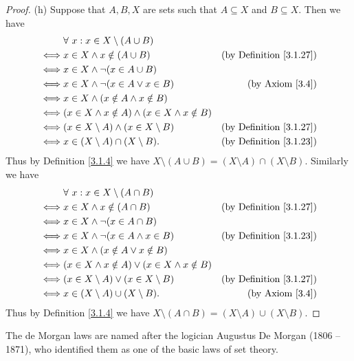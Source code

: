 \begin{proof}{(h)}
Suppose that \(A, B, X\) are sets such that \(A \subseteq X\) and \(B \subseteq X\).
Then we have
\begin{align*}
& \forall\ x : x \in X \setminus (A \cup B) \\
\iff & x \in X \land x \notin (A \cup B) & \text{(by Definition \ref{3.1.27})} \\
\iff & x \in X \land \lnot (x \in A \cup B) \\
\iff & x \in X \land \lnot (x \in A \lor x \in B) & \text{(by Axiom \ref{3.4})} \\
\iff & x \in X \land (x \notin A \land x \notin B) \\
\iff & (x \in X \land x \notin A) \land (x \in X \land x \notin B) \\
\iff & (x \in X \setminus A) \land (x \in X \setminus B) & \text{(by Definition \ref{3.1.27})} \\
\iff & x \in (X \setminus A) \cap (X \setminus B). & \text{(by Definition \ref{3.1.23})}
\end{align*}
Thus by Definition \ref{3.1.4} we have \(X \setminus (A \cup B) = (X \setminus A) \cap (X \setminus B)\).
Similarly we have
\begin{align*}
& \forall\ x : x \in X \setminus (A \cap B) \\
\iff & x \in X \land x \notin (A \cap B) & \text{(by Definition \ref{3.1.27})} \\
\iff & x \in X \land \lnot (x \in A \cap B) \\
\iff & x \in X \land \lnot (x \in A \land x \in B) & \text{(by Definition \ref{3.1.23})} \\
\iff & x \in X \land (x \notin A \lor x \notin B) \\
\iff & (x \in X \land x \notin A) \lor (x \in X \land x \notin B) \\
\iff & (x \in X \setminus A) \lor (x \in X \setminus B) & \text{(by Definition \ref{3.1.27})} \\
\iff & x \in (X \setminus A) \cup (X \setminus B). & \text{(by Axiom \ref{3.4})}
\end{align*}
Thus by Definition \ref{3.1.4} we have \(X \setminus (A \cap B) = (X \setminus A) \cup (X \setminus B)\).
\end{proof}

\begin{remark}\label{3.1.29}
The de Morgan laws are named after the logician Augustus De Morgan (1806 -- 1871), who identified them as one of the basic laws of set theory.
\end{remark}

